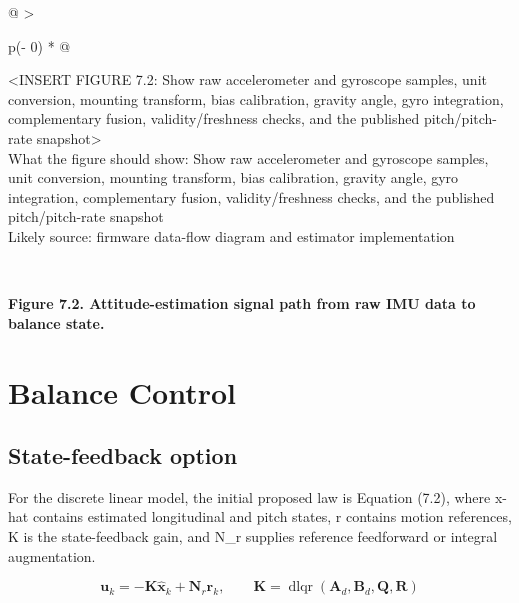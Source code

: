 \begin{longtable}[]{@{}
  >{\raggedright\arraybackslash}p{(\columnwidth - 0\tabcolsep) * }@{}}
\toprule\noalign{}
\begin{minipage}[b]{\linewidth}\raggedright
\textless INSERT FIGURE 7.2: Show raw accelerometer and gyroscope
samples, unit conversion, mounting transform, bias calibration, gravity
angle, gyro integration, complementary fusion, validity\slash{}freshness
checks, and the published pitch\slash{}pitch-rate snapshot\textgreater{}\\
What the figure should show: Show raw accelerometer and gyroscope
samples, unit conversion, mounting transform, bias calibration, gravity
angle, gyro integration, complementary fusion, validity\slash{}freshness
checks, and the published pitch\slash{}pitch-rate snapshot\\
Likely source: firmware data-flow diagram and estimator
implementation\strut
\end{minipage} \\
\midrule\noalign{}
\endhead
\bottomrule\noalign{}
\endlastfoot
\end{longtable}

\begin{center}\singlespacing
{}
\textbf{Figure 7.2. Attitude-estimation signal path from raw IMU data to balance state.}
\end{center}

\section{Balance Control}\label{balance-control}

\subsection{State-feedback option}\label{state-feedback-option}

For the discrete linear model, the initial proposed law is Equation
(7.2), where x-hat contains estimated longitudinal and pitch states, r
contains motion references, K is the state-feedback gain, and N\_r
supplies reference feedforward or integral augmentation.

\begin{equation}
\mathbf{u}_{k}=-\mathbf{K}\hat{\mathbf{x}}_{k}+\mathbf{N}_{r}\mathbf{r}_{k},\qquad
\mathbf{K}=\operatorname{dlqr}(\mathbf{A}_{d},\mathbf{B}_{d},\mathbf{Q},\mathbf{R})
\label{eq:7-2}
\end{equation}

